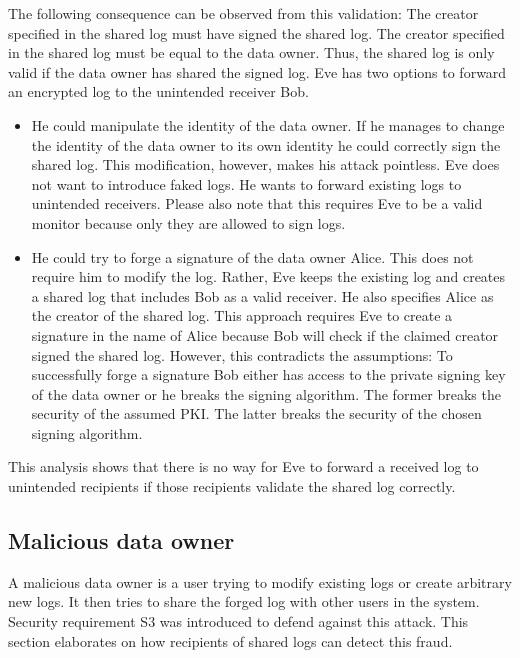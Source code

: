 \documentclass[../main.tex]{subfiles}
\begin{document}
The following consequence can be observed from this validation:
The creator specified in the shared log must have signed the shared log.
The creator specified in the shared log must be equal to the data owner.
Thus, the shared log is only valid if the data owner has shared the signed log.
Eve has two options to forward an encrypted log to the unintended receiver Bob. 
\begin{itemize}
    \item 
    He could manipulate the identity of the data owner.
    If he manages to change the identity of the data owner to its own identity he could correctly sign the shared log.
    This modification, however, makes his attack pointless.
    Eve does not want to introduce faked logs.
    He wants to forward existing logs to unintended receivers.
    Please also note that this requires Eve to be a valid monitor because only they are allowed to sign logs.
    \item 
    He could try to forge a signature of the data owner Alice.
    This does not require him to modify the log.
    Rather, Eve keeps the existing log and creates a shared log that includes Bob as a valid receiver.
    He also specifies Alice as the creator of the shared log.
    This approach requires Eve to create a signature in the name of Alice because Bob will check if the claimed creator signed the shared log.
    However, this contradicts the assumptions:
    To successfully forge a signature Bob either has access to the private signing key of the data owner or he breaks the signing algorithm.
    The former breaks the security of the assumed PKI.
    The latter breaks the security of the chosen signing algorithm.
\end{itemize}

This analysis shows that there is no way for Eve to forward a received log to unintended recipients if those recipients validate the shared log correctly.


\subsection{Malicious data owner}
A malicious data owner is a user trying to modify existing logs or create arbitrary new logs.
It then tries to share the forged log with other users in the system.
Security requirement S3 was introduced to defend against this attack.
This section elaborates on how recipients of shared logs can detect this fraud.
\end{document}
